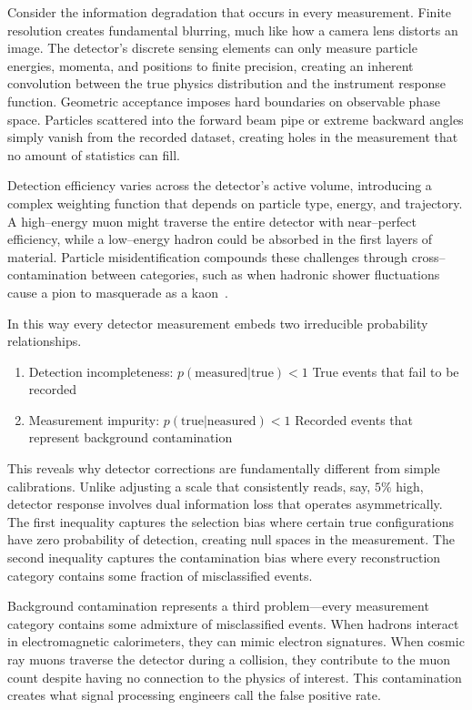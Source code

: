    Consider the information degradation that occurs in every measurement. 
    Finite resolution creates fundamental blurring, much like how a camera lens distorts an image.
    The detector's discrete sensing elements can only measure particle energies, momenta, and positions to finite precision, creating an inherent convolution between the true physics distribution and the instrument response function.
    Geometric acceptance imposes hard boundaries on observable phase space.
    Particles scattered into the forward beam pipe or extreme backward angles simply vanish from the recorded dataset, creating holes in the measurement that no amount of statistics can fill.
    
    Detection efficiency varies across the detector's active volume, introducing a complex weighting function that depends on particle type, energy, and trajectory.
    A high--energy muon might traverse the entire detector with near--perfect efficiency, while a low--energy hadron could be absorbed in the first layers of material.
    Particle misidentification compounds these challenges through cross--contamination between categories, such as when hadronic shower fluctuations cause a pion to masquerade as a kaon~\cite{belle_collaboration_precision_2013}.

    In this way every detector measurement embeds two irreducible probability relationships.
    \begin{enumerate}
        \item Detection incompleteness: \(p(\text{measured}|\text{true}) < 1\) True events that fail to be recorded
        \item Measurement impurity: \(p(\text{true}|\text{neasured}) < 1\) Recorded events that represent background contamination
    \end{enumerate}
    This reveals why detector corrections are fundamentally different from simple calibrations.
    Unlike adjusting a scale that consistently reads, say, \(5\%\) high, detector response involves dual information loss that operates asymmetrically.
    The first inequality captures the selection bias where certain true configurations have zero probability of detection, creating null spaces in the measurement.
    The second inequality captures the contamination bias where every reconstruction category contains some fraction of misclassified events.
    
    Background contamination represents a third problem---every measurement category contains some admixture of misclassified events.
    When hadrons interact in electromagnetic calorimeters, they can mimic electron signatures.
    When cosmic ray muons traverse the detector during a collision, they contribute to the muon count despite having no connection to the physics of interest.
    This contamination creates what signal processing engineers call the false positive rate.
    
